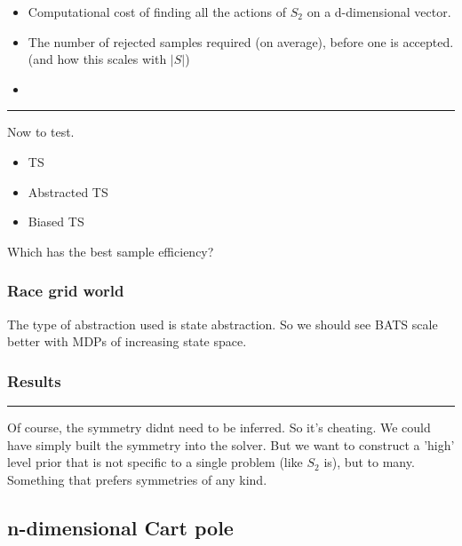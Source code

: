 \begin{itemize}
	\item Computational cost of finding all the actions of $S_2$ on a d-dimensional vector.
	\item The number of rejected samples required (on average), before one is accepted. (and how this scales with $|S|$)
	\item
\end{itemize}


\begin{center}\rule{0.5\linewidth}{\linethickness}\end{center}

Now to test.

\begin{itemize}
	\tightlist
	\item TS
	\item Abstracted TS
	\item Biased TS
\end{itemize}

Which has the best sample efficiency?

\subsubsection{Race grid world}

The type of abstraction used is state abstraction. So we should see BATS scale better with MDPs of increasing state space.

\subsubsection{Results}




\begin{center}\rule{0.5\linewidth}{\linethickness}\end{center}

Of course, the symmetry didnt need to be inferred. So it's cheating.
We could have simply built the symmetry into the solver. But we want to
construct a 'high' level prior that is not specific to a single problem (like $S_2$ is), but
to many. Something that prefers symmetries of any kind.

\subsection{n-dimensional Cart pole}\label{action-space-experiments}

